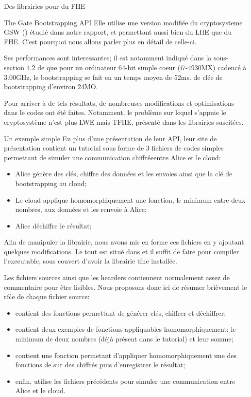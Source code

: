 \begin{section}{Des librairies pour du FHE}
\begin{subsection}{The Gate Bootstrapping API}
Elle utilise une version modifiée du cryptosysteme GSW (\cite{C:GenSahWat13})
étudié dans notre rapport, et permettant aussi bien du LHE que du FHE. C'est
pourquoi nous allons parler plus en détail de celle-ci.

Ses performances sont interessantes; il est notamment indiqué dans la sous-section
4.2 de \cite{cryptoeprint:2016:870} que pour un ordinateur 64-bit simple coeur 
(i7-4930MX) cadencé à 3.00GHz, le bootstrapping se fait en un temps moyen de 52ms.
de clée de bootstrapping d'environ 24MO.

Pour arriver à de tels résultats, de nombreuses modifications et optimisations dans le codes 
ont été faites. Notamment, le problème sur lequel s'appuie le cryptosystème n'est plus 
LWE mais TFHE, présenté dans les librairies suscitées.

\begin{subsubsection}{Un exemple simple}
En plus d'une présentation de leur API, leur site de présentation
contient un tutorial sous forme de 3 fichiers de codes simples 
permettant de simuler une \fg communication chiffrée\fg entre Alice et le cloud:
\begin{itemize}
\item Alice génère des clés, chiffre des données et les envoies ainsi
	que la clé de bootstrapping au cloud;
\item Le cloud applique homomorphiquement une fonction, le minimum
	entre deux nombres, aux données et les renvoie à Alice;
\item Alice déchiffre le résultat;
\end{itemize}
Afin de manipuler la librairie, nous avons \og mis en forme \fg ces fichiers
en y ajoutant quelques modifications. Le tout est situé dans 
 et il suffit de faire  
pour compiler l'executable, sous couvert d'avoir la librairie tfhe installée.
	
Les fichiers sources ainsi que les hearders contiennent normalement assez de
commentaire pour être lisibles. Nous proposons donc ici de résumer brièvement 
le rôle de chaque fichier source:
\begin{itemize}
\item {} contient des fonctions permettant de générer
clés, chiffrer et déchiffrer;
\item {} contient deux exemples de fonctions 
appliquables homomorphiquement: le minimum de deux nombres (déjà 
présent dans le tutorial) et leur somme;
\item {} contient une fonction permetant d'appliquer 
homomorphiquement une des fonctions de 
sur des chiffrés puis d'enregistrer le résultat;
\item enfin,  utilise les fichiers précédents
	pour simuler une communication entre Alice et le cloud.
\end{itemize}



\end{subsubsection}
\end{subsection}
\end{section}
